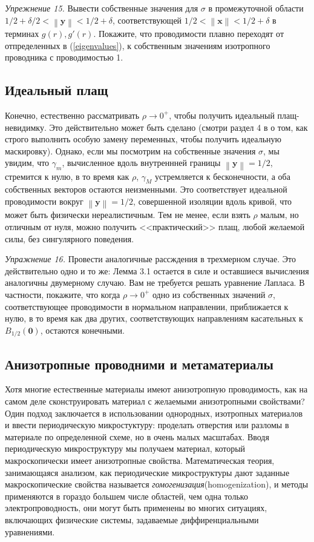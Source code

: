 \documentclass[a4paper, 12pt]{article}
\newcommand{\normb}[1]{\left\lVert\textbf{#1}\right\rVert}
\begin{document}
\textit{Упрежнение 15.} Вывести собственные значения для $\sigma$ в промежуточной
области $1/2 + \delta/2 < \normb{y} < 1/2+\delta$, соответствующей 
$1/2 < \normb{x} < 1/2+\delta$ в терминах $g(r), g'(r)$.
Покажите, что проводимости плавно переходят от отпределенных в (\ref{eigenvalues}),
к собственным значениям изотропного проводника с проводимостью 1.

\subsection{Идеальный плащ}
Конечно, естественно рассматривать $\rho \to 0^+$, чтобы получить идеальный 
плащ-невидимку. Это действительно может быть сделано (смотри раздел 4 в \cite{13}
о том, как строго выполнить особую замену переменных, чтобы получить идеальную 
маскировку). Однако, если мы посмотрим на собственные значения $\sigma$, мы увидим,
что $\gamma_m$, вычисленное вдоль внутреннней границы $\normb{y} = 1/2$, стремится
к нулю, в то время как $\rho$, $\gamma_M$ устремляется к бесконечности, а оба 
собственных векторов остаются неизменными. Это соответствует идеальной проводимости
вокруг $\normb{y} = 1/2$, совершенной изоляции вдоль кривой, что может быть
физически нереалистичным. Тем не менее, если взять $\rho$ малым, но отличным от нуля,
можно получить <<практический>> плащ, любой желаемой силы, без сингулярного поведения.

\textit{Упражнение 16.} Провести аналогичные рассждения в трехмерном случае. Это
действительно одно и то же: Лемма 3.1 остается в силе и оставшиеся вычисления 
аналогичны двумерному случаю. Вам не требуется решать уравнение Лапласа. В частности,
покажите, что когда $\rho \to 0^+$ одно из собственных значений $\sigma$, 
соответствующее проводимости в нормальном направлении, приближается к нулю,
в то время как два других, соответствующих направлениям касательных к 
$B_{1/2}(\textbf{0})$, остаются конечными.

\subsection{Анизотропные проводними и метаматериалы}
Хотя многие естественные материалы имеют анизотропную проводимость, как на самом деле
сконструировать материал с желаемыми анизотропными свойствами? Один подход заключается
в использовании однородных, изотропных материалов и ввести периодическую 
микростуктуру: проделать отверстия или разломы в материале по определенной схеме,	
но в очень малых масштабах. Вводя периодическую микроструктуру мы получаем материал,
который макроскопически имеет анизотропные свойства. Математическая теория, 
занимающаяся анализом, как периодические микроструктуры дают заданные макроскопические
свойства называется \textit{гомогенизация}(homogenization), и методы применяются
в гораздо большем числе областей, чем одна только электропроводность, они могут
быть применены во многих ситуациях, включающих физические системы, задаваемые
диффиренциальными уравнениями.
\end{document}
